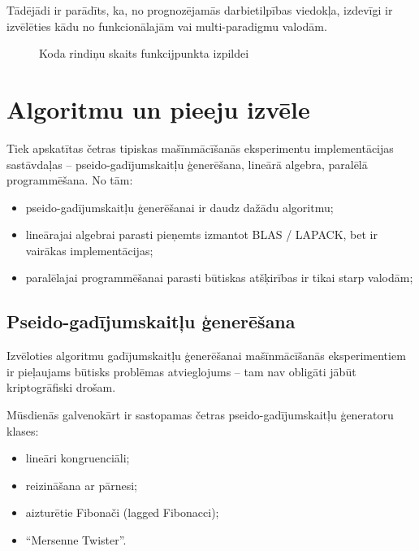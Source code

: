 \documentclass{ludis}
\begin{document}
Tādējādi ir parādīts, ka, no prognozējamās darbietilpības viedokļa, izdevīgi ir izvēlēties kādu no funkcionālajām vai multi-paradigmu valodām.
\begin{figure}
  \centering
  \caption[Koda rindiņas funkcijpunktam]{Koda rindiņu skaits funkcijpunkta izpildei \footnotemark \cite{qsm_sloc_fp} \cite{mayes_sloc_fp}}
  \label{fig:sloc_per_fp}
\end{figure}

\section{Algoritmu un pieeju izvēle}
Tiek apskatītas četras tipiskas mašīnmācīšanās eksperimentu implementācijas sastāvdaļas -- pseido-gadījumskaitļu ģenerēšana, lineārā algebra, paralēlā programmēšana. No tām:
\begin{itemize}
\item pseido-gadījumskaitļu ģenerēšanai ir daudz dažādu algoritmu;
\item lineārajai algebrai parasti pieņemts izmantot BLAS / LAPACK, bet ir vairākas implementācijas;
\item paralēlajai programmēšanai parasti būtiskas atšķirības ir tikai starp valodām;
\end{itemize}

\subsection{Pseido-gadījumskaitļu ģenerēšana}
Izvēloties algoritmu gadījumskaitļu ģenerēšanai mašīnmācīšanās eksperimentiem ir pieļaujams būtisks problēmas atvieglojums -- tam nav obligāti jābūt kriptogrāfiski drošam.

Mūsdienās galvenokārt ir sastopamas četras pseido-gadījumskaitļu ģeneratoru klases:
\begin{itemize}
\item lineāri kongruenciāli;
\item reizināšana ar pārnesi;
\item aizturētie Fibonači (lagged Fibonacci);
\item ``Mersenne Twister''.
\end{itemize}
\end{document}

